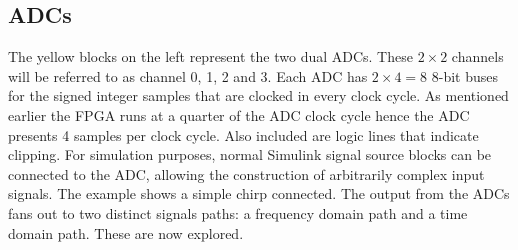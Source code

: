 
\subsection{ADCs}
The yellow blocks on the left represent the two dual ADCs. These \(2 \times 2\) channels will be referred to as channel 0, 1, 2 and 3. Each ADC has \(2 \times 4 = 8\) 8-bit buses for the signed integer samples that are clocked in every clock cycle. As mentioned earlier the FPGA runs at a quarter of the ADC clock cycle hence the ADC presents 4 samples per clock cycle.  Also included are logic lines that indicate clipping. For simulation purposes, normal Simulink signal source blocks can be connected to the ADC, allowing the construction of arbitrarily complex input signals. The example shows a simple chirp connected. The output from the ADCs fans out to two distinct signals paths: a frequency domain path and a time domain path. These are now explored.

